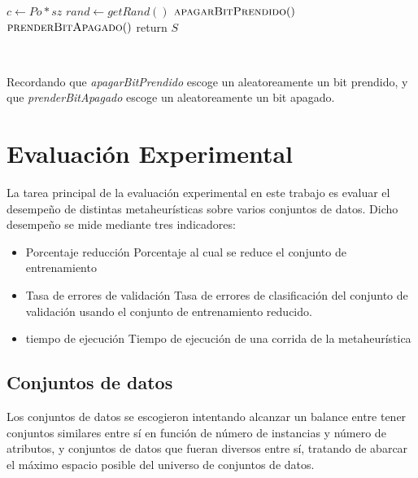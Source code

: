 \documentclass[11pt]{article}
\begin{document}
    {\fontsize{10}{10}\selectfont
    \begin{algorithmic}
        \State $c \gets Po * sz$   
                \State $rand \gets getRand()$     
                \State $\Call{apagarBitPrendido}$ 
                \Else
                \State $\Call{prenderBitApagado}$ 
                \EndIf
            \EndFor
            \State return $S$
        \EndFunction
    \end{algorithmic}
    }

    ~\ 

  Recordando que \emph{apagarBitPrendido} escoge un aleatoreamente un bit prendido,
  y  que \emph{prenderBitApagado} escoge un aleatoreamente un bit apagado.

\clearpage

\section{Evaluación Experimental}

La tarea principal de la evaluación experimental en este trabajo es evaluar el desempeño de distintas metaheurísticas sobre varios conjuntos de datos. Dicho desempeño se mide mediante tres indicadores: 
\begin{itemize}
\item Porcentaje reducción 
    Porcentaje al cual se reduce el conjunto de entrenamiento
\item Tasa de errores de validación
    Tasa de errores de clasificación del conjunto de validación usando el conjunto de entrenamiento reducido.
\item tiempo de ejecución
    Tiempo de ejecución de una corrida de la metaheurística
\end{itemize}


\subsection{Conjuntos de datos}
Los conjuntos de datos se escogieron intentando alcanzar un balance entre tener conjuntos similares entre sí en función de número de instancias y número de atributos, y conjuntos de datos que fueran diversos entre sí, tratando de abarcar el máximo espacio posible del universo de conjuntos de datos.
\end{document}
